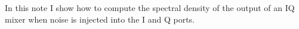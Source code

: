 In this note I show how to compute the spectral density of the output of an IQ mixer when noise is injected into the I and Q ports.
